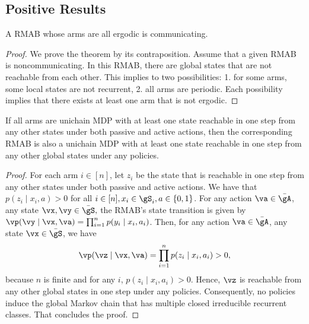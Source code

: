\subsection{Positive Results}

\begin{thm}
    \label{thm:aperiodic_RB_comm} A RMAB whose arms are all ergodic is communicating. 
\end{thm}
\begin{proof}
    We prove the theorem by its contraposition. Assume that a given RMAB is noncommunicating.
    In this RMAB, there are global states that are not reachable from each other.
    This implies to two possibilities: 1. for some arms, some local states are not recurrent, 2. all arms are periodic.
    Each possibility implies that there exists at least one arm that is not ergodic.
\end{proof}

\begin{thm}
    \label{thm:unichain} If all arms are unichain MDP with at least one state reachable in one step from any other states under both passive and active actions, then the corresponding RMAB is also a unichain MDP with at least one state reachable in one step from any other global states under any policies.
\end{thm}
\begin{proof}
    For each arm $i\in[n]$, let $z_i$ be the state that is reachable in one step from any other states under both passive and active actions.
    We have that $p(z_i \mid x_i, a)>0$ for all $i\in[n], x_i\in\gS_i,a\in\{0,1\}$.
    For any action $\va\in\bar{\gA}$, any state $\vx,\vy\in\bar{\gS},$ the RMAB's state transition is given by ${\vp(\vy \mid \vx, \va) =\prod_{i=1}^n p(y_i \mid x_i, a_i)}$.
    Then, for any action $\va\in\bar{\gA}$, any state $\vx\in\bar{\gS}$, we have
    \begin{align*}
        \vp(\vz \mid \vx, \va) =\prod_{i=1}^n p(z_i \mid x_i,a_i) > 0,
    \end{align*}
    because $n$ is finite and for any $i$, $p(z_i \mid x_i, a_i)>0$.
    Hence, $\vz$ is reachable from any other global states in one step under any policies.
    Consequently, no policies induce the global Markov chain that has multiple closed irreducible recurrent classes.
    That concludes the proof.
\end{proof}

